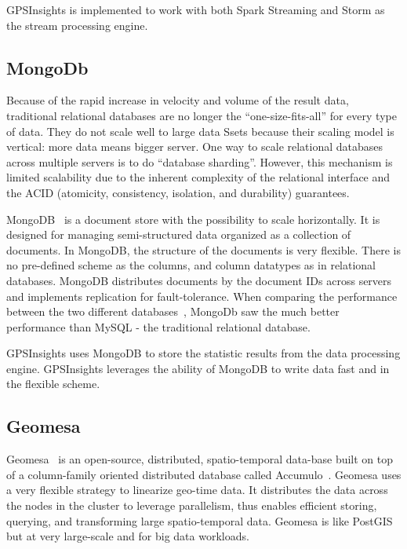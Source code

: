 \documentclass{sig-alternate-05-2015}
\begin{document}
GPSInsights is implemented to work with both Spark Streaming and Storm as the stream processing engine.

\subsection{MongoDb}

Because of the rapid increase in velocity and volume of the result data, traditional relational databases are no longer the ``one-size-fits-all'' for every type of data. They do not scale well to large data Ssets because their scaling model is vertical: more data means bigger server. One way to scale relational databases across multiple servers is to do ``database sharding''. However, this mechanism is limited scalability due to the inherent complexity of the relational interface and the ACID (atomicity, consistency, isolation, and durability) guarantees. 

MongoDB~\cite{mongodbweb} is a document store with the possibility to scale horizontally. It is designed for managing semi-structured data organized as a collection of documents. In MongoDB, the structure of the documents is very flexible. There is no pre-defined scheme as the columns, and column datatypes as in relational databases. MongoDB distributes documents by the document IDs across servers and implements replication for fault-tolerance. When comparing the performance between the two different databases~\cite{Wu:Comparisons}, MongoDb saw the much better performance than MySQL - the traditional relational database.

GPSInsights uses MongoDB to store the statistic results from the data processing engine. GPSInsights leverages the ability of MongoDB to write data fast and in the flexible scheme. 

\subsection{Geomesa}
 
Geomesa~\cite{fox2013spatio} is an open-source, distributed, spatio-temporal data-base built on top of a column-family oriented distributed database called Accumulo~\cite{accumuloonline}. Geomesa uses a very flexible strategy to linearize geo-time data. It distributes the data across the nodes in the cluster to leverage parallelism, thus enables efficient storing, querying, and transforming large spatio-temporal data. Geomesa is like PostGIS~\cite{posgis} but at very large-scale and for big data workloads. 
\end{document}
